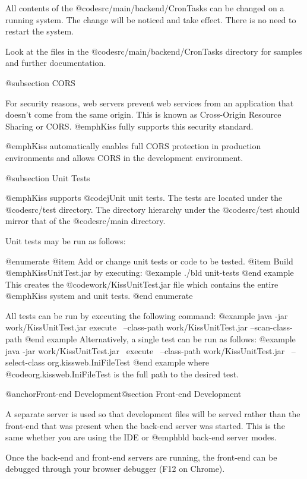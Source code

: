 All contents of the @code{src/main/backend/CronTasks} can be changed
on a running system.  The change will be noticed and take effect.
There is no need to restart the system.

Look at the files in the @code{src/main/backend/CronTasks}
directory for samples and further documentation.

@subsection CORS

For security reasons, web servers prevent web services from
an application that doesn't come from the same origin.  This is
known as Cross-Origin Resource Sharing or CORS.  @emph{Kiss} fully
supports this security standard. 

@emph{Kiss} automatically enables full CORS protection in production
environments and allows CORS in the development environment.

@subsection Unit Tests

@emph{Kiss} supports @code{jUnit} unit tests.  The tests are located
under the @code{src/test} directory.  The directory hierarchy under
the @code{src/test} should mirror that of the @code{src/main}
directory.

Unit tests may be run as follows:

@enumerate
@item
Add or change unit tests or code to be tested.
@item
Build @emph{KissUnitTest.jar} by executing:
@example
    ./bld unit-tests
@end example
This creates the @code{work/KissUnitTest.jar} file which contains
the entire @emph{Kiss} system and unit tests.
@end enumerate

All tests can be run by executing the following command:
@example
java -jar work/KissUnitTest.jar  execute \
  --class-path work/KissUnitTest.jar  --scan-class-path
@end example
Alternatively, a single test can be run as follows:
@example
java -jar work/KissUnitTest.jar \
  execute \
  --class-path work/KissUnitTest.jar \
  --select-class org.kissweb.IniFileTest
@end example
where @code{org.kissweb.IniFileTest} is the full path to the desired test.

@anchor{Front-end Development}@section Front-end Development

A separate server is used so that development files will be served
rather than the front-end that was present when the back-end server
was started.  This is the same whether you are using the IDE or
@emph{bld} back-end server modes.

Once the back-end and front-end servers are running, the front-end can
be debugged through your browser debugger (F12 on Chrome).

